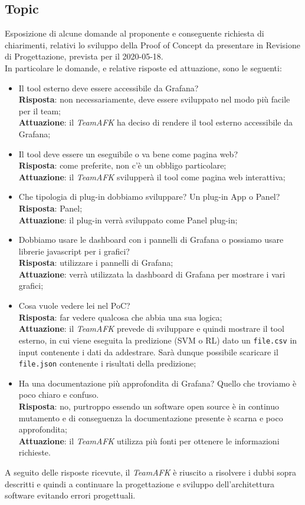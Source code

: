 \subsection{Topic}
Esposizione di alcune domande al proponente e conseguente richiesta di chiarimenti, relativi lo sviluppo della Proof of Concept da presentare in Revisione di Progettazione, prevista per il 2020-05-18.\\
In particolare le domande, e relative risposte ed attuazione, sono le seguenti:
\begin{itemize}
	\item Il tool esterno deve essere accessibile da Grafana\glo?\\
	\textbf{Risposta}: non necessariamente, deve essere sviluppato nel modo più facile per il team;\\
	\textbf{Attuazione}: il \textit{TeamAFK} ha deciso di rendere il tool esterno accessibile da Grafana;
	\item Il tool deve essere un eseguibile o va bene come pagina web? \\
	\textbf{Risposta}: come preferite, non c'è un obbligo particolare; \\
	\textbf{Attuazione}: il \textit{TeamAFK} svilupperà il tool come pagina web interattiva;
	\item Che tipologia di plug-in dobbiamo sviluppare? Un plug-in App o Panel? \\
	\textbf{Risposta}: Panel;\\
	\textbf{Attuazione}: il plug-in verrà sviluppato come Panel plug-in;
	\item Dobbiamo usare le dashboard con i pannelli di Grafana o possiamo usare librerie javascript per i grafici? \\
	\textbf{Risposta}: utilizzare i pannelli di Grafana;\\
	\textbf{Attuazione}: verrà utilizzata la dashboard di Grafana per mostrare i vari grafici;
	\item Cosa vuole vedere lei nel PoC? \\
	\textbf{Risposta}: far vedere qualcosa che abbia una sua logica;\\
	\textbf{Attuazione}: il \textit{TeamAFK} prevede di sviluppare e quindi mostrare il tool esterno, in cui viene eseguita la predizione (SVM o RL) dato un \texttt{file.csv} in input contenente i dati da addestrare. Sarà dunque possibile scaricare il \texttt{file.json} contenente i risultati della predizione;
	\item Ha una documentazione più approfondita di Grafana? Quello che troviamo è poco chiaro e confuso.\\
	\textbf{Risposta}: no, purtroppo essendo un software open source è in continuo mutamento e di conseguenza la documentazione presente è scarna e poco approfondita;\\
	\textbf{Attuazione}: il \textit{TeamAFK} utilizza più fonti per ottenere le informazioni richieste.
\end{itemize}
A seguito delle risposte ricevute, il \textit{TeamAFK} è riuscito a risolvere i dubbi sopra descritti e quindi a continuare la progettazione e sviluppo dell'architettura software evitando errori progettuali.